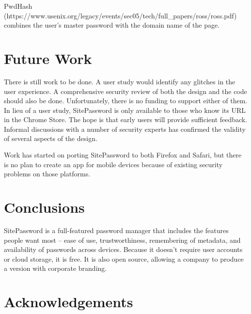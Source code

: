 PwdHash (https://www.usenix.org/legacy/events/sec05/tech/full\_papers/ross/ross.pdf) combines the user's master password with the domain name of the page.

\section{Future Work}\label{sec:future}

There is still work to be done.  A user study would identify any glitches in the user experience.  A comprehensive security review of both the design and the code should also be done.  Unfortunately, there is no funding to support either of them.  In lieu of a user study, SitePassword is only available to those who know its URL in the Chrome Store.  The hope is that early users will provide sufficient feedback.  Informal discussions with a number of security experts has confirmed the validity of several aspects of the design.

Work has started on porting SitePassword to both Firefox and Safari, 
but there is no plan to create an app for mobile devices because of 
existing security problems on those platforms.

\section{Conclusions}\label{sec:conclusions}

SitePassword is a full-featured password manager that includes the features people want most -- ease of use, trustworthiness, remembering of metadata, and availability of passwords across devices.  Because it doesn't require user accounts or cloud storage, it is free.  It is also open source, allowing a company to produce a version with corporate branding.

\section{Acknowledgements}\label{sec:acks}

